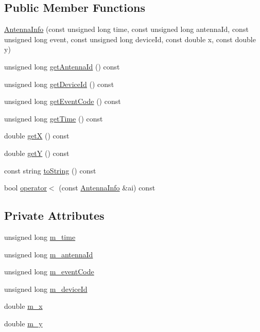 \subsection*{Public Member Functions}
\begin{DoxyCompactItemize}
\item 
\mbox{\hyperlink{class_antenna_info_a1009059d8b7a6907c7e886af95fe7d9c}{Antenna\+Info}} (const unsigned long time, const unsigned long antenna\+Id, const unsigned long event, const unsigned long device\+Id, const double x, const double y)
\item 
unsigned long \mbox{\hyperlink{class_antenna_info_a1aee619b1f3d45e3da945f17d8531bbf}{get\+Antenna\+Id}} () const
\item 
unsigned long \mbox{\hyperlink{class_antenna_info_a25a6a3ca6afeba45c00f2312b8d2d9de}{get\+Device\+Id}} () const
\item 
unsigned long \mbox{\hyperlink{class_antenna_info_a898d46ed6fd2676e370ae8c325ffd679}{get\+Event\+Code}} () const
\item 
unsigned long \mbox{\hyperlink{class_antenna_info_aaae1e1105ba4a724c0061e3f7904b1e5}{get\+Time}} () const
\item 
double \mbox{\hyperlink{class_antenna_info_a3817cba0231888dc5977105ace0faddb}{getX}} () const
\item 
double \mbox{\hyperlink{class_antenna_info_aa385e3e85d783b81d69014a64b5fc94f}{getY}} () const
\item 
const string \mbox{\hyperlink{class_antenna_info_ae1ba7432ca7aef9a4f79a422ee195a58}{to\+String}} () const
\item 
bool \mbox{\hyperlink{class_antenna_info_a74156652eb5ad9a62f41fea726e33b40}{operator$<$}} (const \mbox{\hyperlink{class_antenna_info}{Antenna\+Info}} \&ai) const
\end{DoxyCompactItemize}
\subsection*{Private Attributes}
\begin{DoxyCompactItemize}
\item 
unsigned long \mbox{\hyperlink{class_antenna_info_a355d929c83040e154f635ce149286b05}{m\+\_\+time}}
\item 
unsigned long \mbox{\hyperlink{class_antenna_info_a7776748da0e4d9f4b39683066806a897}{m\+\_\+antenna\+Id}}
\item 
unsigned long \mbox{\hyperlink{class_antenna_info_a90e054e1eb790e6b0096bf35a27bbd8e}{m\+\_\+event\+Code}}
\item 
unsigned long \mbox{\hyperlink{class_antenna_info_a006ef0511686a6874503ff398b6bf7e8}{m\+\_\+device\+Id}}
\item 
double \mbox{\hyperlink{class_antenna_info_a80e006159e01abca28d465e80b327992}{m\+\_\+x}}
\item 
double \mbox{\hyperlink{class_antenna_info_a3a9ec27d75b8d2f0d750d64b7a2a3069}{m\+\_\+y}}
\end{DoxyCompactItemize}


